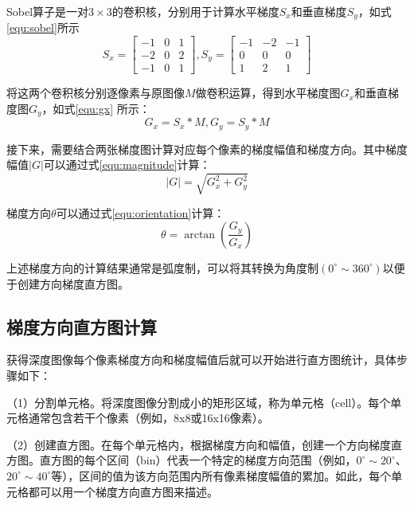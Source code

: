 Sobel算子是一对$3 \times 3$的卷积核，分别用于计算水平梯度$S_{x}$和垂直梯度$S_{y}$，如式\ref{equ:sobel}所示
\begin{equation}\label{equ:sobel}
S_x=\left[\begin{array}{ccc}
-1 & 0 & 1 \\
-2 & 0 & 2 \\
-1 & 0 & 1
\end{array}\right], S_y=\left[\begin{array}{ccc}
-1 & -2 & -1 \\
0 & 0 & 0 \\
1 & 2 & 1
\end{array}\right]
\end{equation}

将这两个卷积核分别逐像素与原图像$M$做卷积运算，得到水平梯度图$G_{x}$和垂直梯度图$G_{y}$，如式\ref{equ:gx} 所示：
\begin{equation}\label{equ:gx}
	G_x = S_x * M, G_y = S_y * M
\end{equation}

接下来，需要结合两张梯度图计算对应每个像素的梯度幅值和梯度方向。其中梯度幅值$|G|$可以通过式\ref{equ:magnitude}计算：
\begin{equation}\label{equ:magnitude}
|G|  = \sqrt{G_x^2 + G_y^2}
\end{equation}

梯度方向$\theta$可以通过式\ref{equ:orientation}计算：
\begin{equation}\label{equ:orientation}
	\theta = \arctan \left ( \frac{G_y}{G_x} \right ) 
\end{equation}


上述梯度方向的计算结果通常是弧度制，可以将其转换为角度制$(0^{\circ} \sim 360^{\circ})$以便于创建方向梯度直方图。

\subsection{梯度方向直方图计算}
获得深度图像每个像素梯度方向和梯度幅值后就可以开始进行直方图统计，具体步骤如下：

（1）分割单元格。将深度图像分割成小的矩形区域，称为单元格（cell）。每个单元格通常包含若干个像素（例如，8x8或16x16像素）。

（2）创建直方图。在每个单元格内，根据梯度方向和幅值，创建一个方向梯度直方图。直方图的每个区间（bin）代表一个特定的梯度方向范围（例如，$0^{\circ} \sim 20^{\circ}$、$20^{\circ} \sim 40^{\circ}$等），区间的值为该方向范围内所有像素梯度幅值的累加。如此，每个单元格都可以用一个梯度方向直方图来描述。

